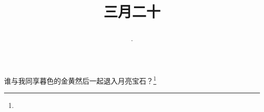 \title{\date[d=28,m=4,y=2024][year:cn-y,年,month:cn,day:cn,日,·,weekday]·三月二十 }
谁与我同享暮色的金黄然后一起退入月亮宝石？\footnote{ }

